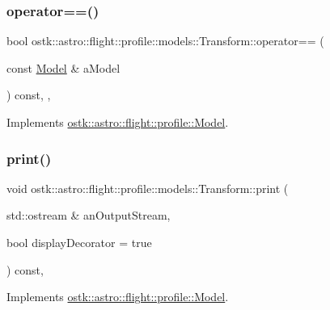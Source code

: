 \subsubsection{\texorpdfstring{operator==()}{operator==()}}
{\footnotesize\ttfamily bool ostk\+::astro\+::flight\+::profile\+::models\+::\+Transform\+::operator== (\begin{DoxyParamCaption}\item[{const \hyperlink{classostk_1_1astro_1_1flight_1_1profile_1_1_model}{Model} \&}]{a\+Model }\end{DoxyParamCaption}) const\hspace{0.3cm}{\ttfamily [override]}, {\ttfamily [protected]}, {\ttfamily [virtual]}}



Implements \hyperlink{classostk_1_1astro_1_1flight_1_1profile_1_1_model_a87f7ca747d79619e4b4bc04aa6a9252a}{ostk\+::astro\+::flight\+::profile\+::\+Model}.

\mbox{\label{classostk_1_1astro_1_1flight_1_1profile_1_1models_1_1_transform_aef9a20156493d68570a989d87ac2f9f6}} 
\subsubsection{\texorpdfstring{print()}{print()}}
{\footnotesize\ttfamily void ostk\+::astro\+::flight\+::profile\+::models\+::\+Transform\+::print (\begin{DoxyParamCaption}\item[{std\+::ostream \&}]{an\+Output\+Stream,  }\item[{bool}]{display\+Decorator = {\ttfamily true} }\end{DoxyParamCaption}) const\hspace{0.3cm}{\ttfamily [override]}, {\ttfamily [virtual]}}



Implements \hyperlink{classostk_1_1astro_1_1flight_1_1profile_1_1_model_ad9bb86b1869150e2bd970e9fa59ce36e}{ostk\+::astro\+::flight\+::profile\+::\+Model}.

\mbox{\label{classostk_1_1astro_1_1flight_1_1profile_1_1models_1_1_transform_a06ac043e7d6577f51578fc14331e1c6d}} 
